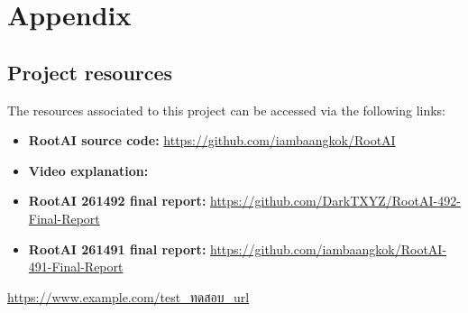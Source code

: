 \chapter{Appendix}


\section{Project resources}

The resources associated to this project can be accessed via the following links:
\begin{itemize}
    \item \textbf{RootAI source code:} \url{https://github.com/iambaangkok/RootAI}
    \item \textbf{Video explanation:} \url{}
    \item \textbf{RootAI 261492 final report:} \url{https://github.com/DarkTXYZ/RootAI-492-Final-Report}
    \item \textbf{RootAI 261491 final report:} \url{https://github.com/iambaangkok/RootAI-491-Final-Report}
\end{itemize}









\url{https://www.example.com/test_ทดสอบ_url}


